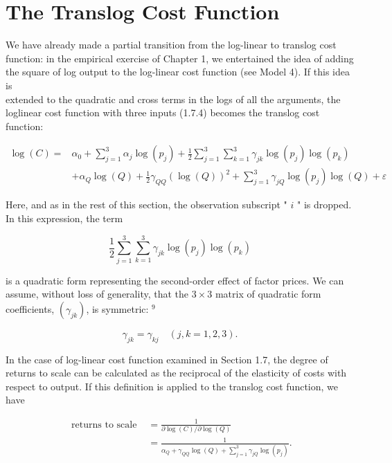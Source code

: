 \documentclass[10pt]{article}
\begin{document}
\section*{The Translog Cost Function}
We have already made a partial transition from the log-linear to translog cost function: in the empirical exercise of Chapter 1, we entertained the idea of adding the square of log output to the log-linear cost function (see Model 4). If this idea is\\
extended to the quadratic and cross terms in the logs of all the arguments, the loglinear cost function with three inputs (1.7.4) becomes the translog cost function:


\begin{align*}
\log (C)= & \alpha_{0}+\sum_{j=1}^{3} \alpha_{j} \log \left(p_{j}\right)+\frac{1}{2} \sum_{j=1}^{3} \sum_{k=1}^{3} \gamma_{j k} \log \left(p_{j}\right) \log \left(p_{k}\right) \\
& +\alpha_{Q} \log (Q)+\frac{1}{2} \gamma_{Q Q}(\log (Q))^{2}+\sum_{j=1}^{3} \gamma_{j Q} \log \left(p_{j}\right) \log (Q)+\varepsilon \tag{4.7.1}
\end{align*}


Here, and as in the rest of this section, the observation subscript " $i$ " is dropped. In this expression, the term

$$
\frac{1}{2} \sum_{j=1}^{3} \sum_{k=1}^{3} \gamma_{j k} \log \left(p_{j}\right) \log \left(p_{k}\right)
$$

is a quadratic form representing the second-order effect of factor prices. We can assume, without loss of generality, that the $3 \times 3$ matrix of quadratic form coefficients, $\left(\gamma_{j k}\right)$, is symmetric: ${ }^{9}$


\begin{equation*}
\gamma_{j k}=\gamma_{k j} \quad(j, k=1,2,3) . \tag{4.7.2}
\end{equation*}


In the case of log-linear cost function examined in Section 1.7, the degree of returns to scale can be calculated as the reciprocal of the elasticity of costs with respect to output. If this definition is applied to the translog cost function, we have


\begin{align*}
\text { returns to scale } & =\frac{1}{\partial \log (C) / \partial \log (Q)} \\
& =\frac{1}{\alpha_{Q}+\gamma_{Q Q} \log (Q)+\sum_{j=1}^{3} \gamma_{j Q} \log \left(p_{j}\right)} . \tag{4.7.3}
\end{align*}
\end{document}
